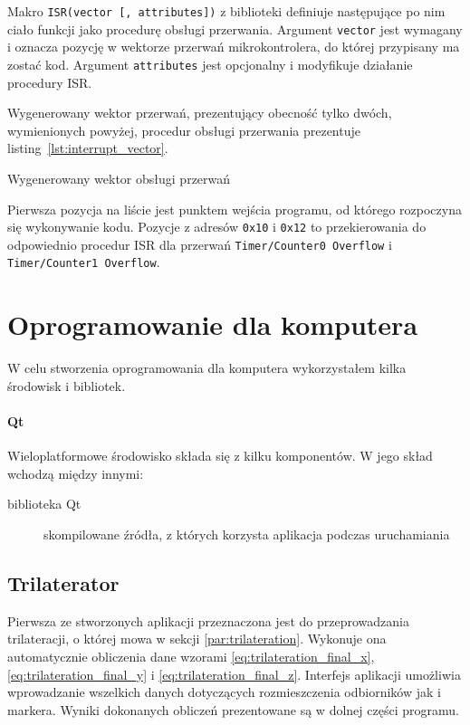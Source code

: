 Makro \texttt{ISR(vector [, attributes])} z biblioteki  definiuje następujące po nim ciało funkcji jako procedurę obsługi przerwania. Argument \texttt{vector} jest wymagany i oznacza pozycję w wektorze przerwań mikrokontrolera, do której przypisany ma zostać kod. Argument \texttt{attributes} jest opcjonalny i modyfikuje działanie procedury ISR.

Wygenerowany wektor przerwań, prezentujący obecność tylko dwóch, wymienionych powyżej, procedur obsługi przerwania prezentuje listing~\ref{lst:interrupt_vector}.

\begin{listing}
  
  \caption[Wektor obsługi przerwań]{Wygenerowany wektor obsługi przerwań}
  \label{lst:interrupt_vector}
\end{listing}

Pierwsza pozycja na liście jest punktem wejścia programu, od którego rozpoczyna się wykonywanie kodu. Pozycje z adresów \texttt{0x10} i \texttt{0x12} to przekierowania do odpowiednio procedur ISR dla przerwań \texttt{Timer/Counter0 Overflow} i \texttt{Timer/Counter1 Overflow}.

\section{Oprogramowanie dla komputera}
W celu stworzenia oprogramowania dla komputera wykorzystałem kilka środowisk i bibliotek.

\paragraph{Qt}
Wieloplatformowe środowisko  składa się z kilku komponentów. W jego skład wchodzą między innymi:
\begin{description}
 \item[biblioteka Qt] skompilowane źródła, z których korzysta aplikacja podczas uruchamiania
\end{description}


\subsection{Trilaterator}
Pierwsza ze stworzonych aplikacji przeznaczona jest do przeprowadzania trilateracji, o której mowa w sekcji \ref{par:trilateration}. Wykonuje ona automatycznie obliczenia dane wzorami \ref{eq:trilateration_final_x}, \ref{eq:trilateration_final_y} i \ref{eq:trilateration_final_z}. Interfejs aplikacji umożliwia wprowadzanie wszelkich danych dotyczących rozmieszczenia odbiorników jak i markera. Wyniki dokonanych obliczeń prezentowane są w dolnej części programu.

